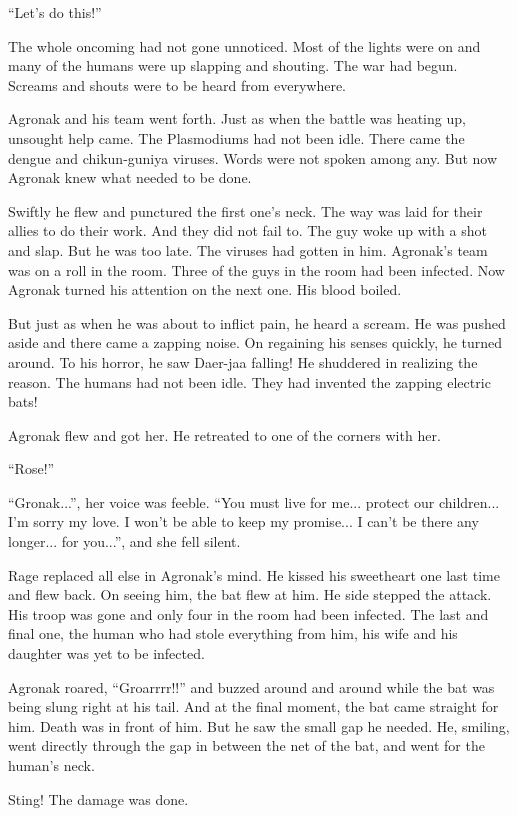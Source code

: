 \documentclass[twoside,11pt,titlepage]{article}
\begin{document}
``Let’s do this!''

The whole oncoming had not gone unnoticed. Most of the lights were on and many of the humans were up slapping and shouting. The war had begun. Screams and shouts were to be heard from everywhere.

Agronak and his team went forth. Just as when the battle was heating up, unsought help came. The Plasmodiums had not been idle. There came the dengue and chikun-guniya viruses. Words were not spoken among any. But now Agronak knew what needed to be done.

Swiftly he flew and punctured the first one's neck. The way was laid for their allies to do their work. And they did not fail to. The guy woke up with a shot and slap. But he was too late. The viruses had gotten in him. Agronak's team was on a roll in the room. Three of the guys in the room had been infected. Now Agronak turned his attention on the next one. His blood boiled.

But just as when he was about to inflict pain, he heard a scream. He was pushed aside and there came a zapping noise. On regaining his senses quickly, he turned around. To his horror, he saw Daer-jaa falling! He shuddered in realizing the reason. The humans had not been idle. They had invented the zapping electric bats!

Agronak flew and got her. He retreated to one of the corners with her.

``Rose!''

``Gronak...'', her voice was feeble. ``You must live for me... protect our children... I'm sorry my love. I won't be able to keep my promise... I can't be there any longer... for you...'', and she fell silent.

Rage replaced all else in Agronak's mind. He kissed his sweetheart one last time and flew back. On seeing him, the bat flew at him. He side stepped the attack. His troop was gone and only four in the room had been infected. The last and final one, the human who had stole everything from him, his wife and his daughter was yet to be infected.

Agronak roared, ``Groarrrr!!'' and buzzed around and around while the bat was being slung right at his tail. And at the final moment, the bat came straight for him. Death was in front of him. But he saw the small gap he needed. He, smiling, went directly through the gap in between the net of the bat, and went for the human's neck.

Sting! The damage was done.
\end{document}
